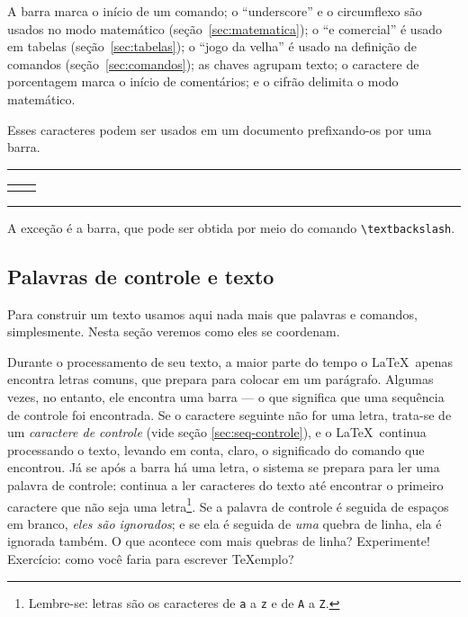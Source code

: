A barra marca o início de um comando; o ``underscore'' e o circumflexo
são usados no modo matemático (seção~\ref{sec:matematica}); o ``e
comercial'' é usado em tabelas (seção~\ref{sec:tabelas}); o ``jogo da
velha'' é usado na definição de comandos (seção~\ref{sec:comandos});
as chaves agrupam texto; o caractere de porcentagem marca o início de
comentários; e o cifrão delimita o modo matemático.

Esses caracteres podem ser usados em um documento prefixando-os por
uma barra.

\medskip
\begin{center}\footnotesize\hrule\smallskip
\begin{tabular}{c|c}
\begin{minipage}{.465\textwidth}

\end{minipage} &
\begin{minipage}{.465\textwidth}
\centering 
\end{minipage}
\end{tabular}
\smallskip\hrule
\end{center}
\medskip

A exceção é a barra, que pode ser obtida  por meio do
comando \verb'\textbackslash'.

\subsection{Palavras de controle e texto}\label{sec:palavras-de-controle}

Para construir um texto usamos aqui nada mais que palavras e comandos,
simplesmente. Nesta seção veremos como eles se coordenam.

Durante o processamento de seu texto, a maior parte do tempo o
\LaTeX\ apenas encontra letras comuns, que prepara para colocar em um
parágrafo. Algumas vezes, no entanto, ele encontra uma barra --- o que
significa que uma sequência de controle foi encontrada. Se o caractere
seguinte não for uma letra, trata-se de um 
\emph{caractere de controle} (vide seção \ref{sec:seq-controle}), e
o \LaTeX\ continua processando o texto, levando em conta, claro, o
significado do comando que encontrou. Já se após a barra há uma
letra, o sistema se prepara para ler uma palavra de controle: continua
a ler caracteres do texto até encontrar o primeiro caractere que não
seja uma letra\footnote{Lembre-se: letras são os caracteres de
  \texttt{a} a \texttt{z} e de \texttt{A} a \texttt{Z}.}. Se a palavra
de controle é seguida de espaços em branco, \emph{eles são
  ignorados}; e se ela é seguida de \emph{uma} quebra de linha, ela é
ignorada também. O que acontece com mais quebras de linha?
Experimente! Exercício: como você faria para escrever \TeX emplo?

